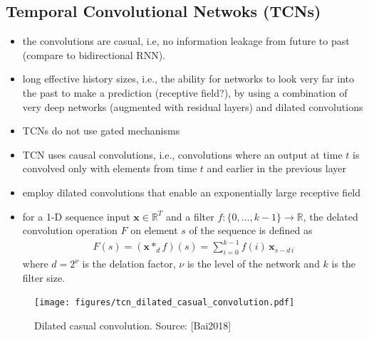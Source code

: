 \documentclass{article}
\begin{document}
\subsection{Temporal Convolutional Netwoks (TCNs)}

\begin{itemize}
\item the convolutions are casual, i.e, no information leakage from future to past (compare to bidirectional RNN).
\item long effective history sizes, i.e., the ability for networks to look very far into the past to make a prediction (receptive field?), by using a combination of very deep networks (augmented with residual layers) and dilated convolutions 
\item TCNs do not use gated mechanisms 
\item TCN uses causal convolutions, i.e., convolutions where an output at time $t$ is convolved only with elements from time $t$ and earlier in the previous layer 
\item employ dilated convolutions that enable an exponentially large receptive field
\item for a 1-D sequence input $\mathbf x \in \mathbb R^T$ and a filter $f:\{ 0, \dots, k-1\} \rightarrow \mathbb R$, the delated convolution operation $F$ on element $s$ of the sequence is defined as
\begin{align}
F(s) = (\mathbf x *_d f)(s) = \sum_{i=0}^{k-1} f(i) \, \mathbf x_{s-d\,i}
\end{align}
where $d = 2^\nu$ is the delation factor, $\nu$ is the level of the network and $k$ is the filter size.  
\end{itemize}
\begin{figure}[htbp]
	\centering
	\texttt{[image: figures/tcn\_dilated\_casual\_convolution.pdf]}
	\caption{Dilated casual convolution. Source: \cite{Bai2018}[Bai2018]}
	\label{fig:figure1}	
\end{figure}
\end{document}

